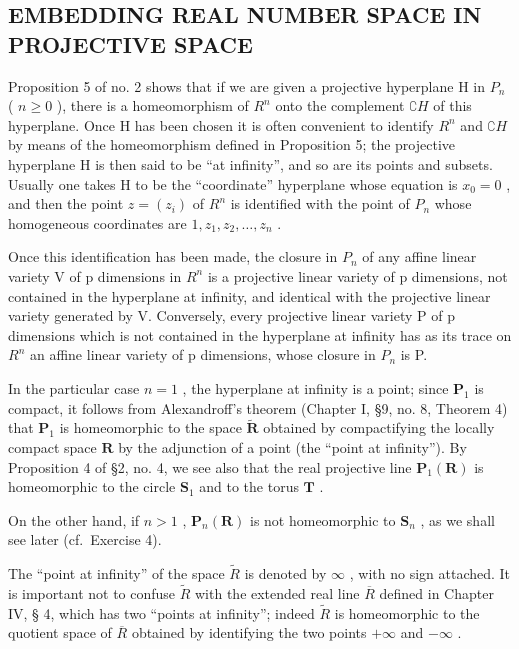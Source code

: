 \subsection{EMBEDDING REAL NUMBER SPACE IN PROJECTIVE SPACE}

Proposition 5 of no. 2 shows that if we are given a projective hyperplane H in \(P_{n}\) ( \(n \geqslant 0\) ), there is a homeomorphism of \(R^{n}\) onto the complement \(\complement H\) of this hyperplane. Once H has been chosen it is often convenient to identify \(R^{n}\) and \(\complement H\) by means of the homeomorphism defined in Proposition 5; the projective hyperplane H is then said to be ``at infinity'', and so are its points and subsets. Usually one takes H to be the ``coordinate'' hyperplane whose equation is \(x_{0}=0\) , and then the point \(z=(z_{i})\) of \(R^{n}\) is identified with the point of \(P_{n}\) whose homogeneous coordinates are \(1, z_{1}, z_{2}, \ldots, z_{n}\) .

Once this identification has been made, the closure in \(P_{n}\) of any affine linear variety V of p dimensions in \(R^{n}\) is a projective linear variety of p dimensions, not contained in the hyperplane at infinity, and identical with the projective linear variety generated by V. Conversely, every projective linear variety P of p dimensions which is not contained in the hyperplane at infinity has as its trace on \(R^{n}\) an affine linear variety of p dimensions, whose closure in \(P_{n}\) is P.

In the particular case \(n = 1\) , the hyperplane at infinity is a point; since \(\mathbf{P}_1\) is compact, it follows from Alexandroff's theorem (Chapter I, §9, no. 8, Theorem 4) that \(\mathbf{P}_1\) is homeomorphic to the space \(\tilde{\mathbf{R}}\) obtained by compactifying the locally compact space \(\mathbf{R}\) by the adjunction of a point (the ``point at infinity''). By Proposition 4 of §2, no. 4, we see also that the real projective line \(\mathbf{P}_1(\mathbf{R})\) is homeomorphic to the circle \(\mathbf{S}_1\) and to the torus \(\mathbf{T}\) .

On the other hand, if \(n > 1\) , \(\mathbf{P}_n(\mathbf{R})\) is not homeomorphic to \(\mathbf{S}_n\) , as we shall see later (cf.~Exercise 4).

The ``point at infinity'' of the space \(\tilde{R}\) is denoted by \(\infty\) , with no sign attached. It is important not to confuse \(\tilde{R}\) with the extended real line \(\overline{R}\) defined in Chapter IV, § 4, which has two ``points at infinity''; indeed \(\tilde{R}\) is homeomorphic to the quotient space of \(\overline{R}\) obtained by identifying the two points \(+\infty\) and \(-\infty\) .

